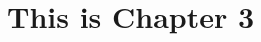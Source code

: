 \documentclass[../main/thesis.tex]{subfiles}
\begin{document}
\chapter{This is Chapter 3}
\label{ch:3}



\bib
\end{document}
